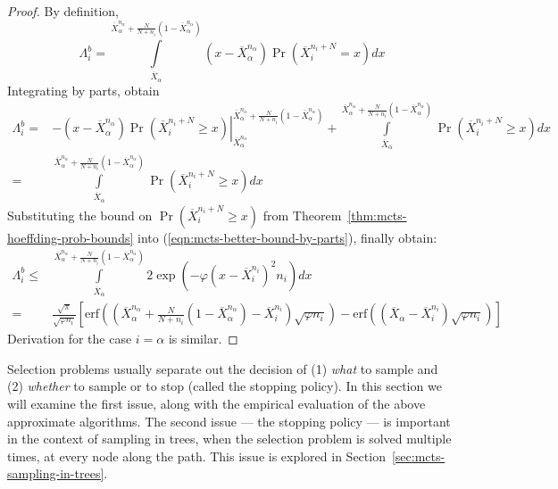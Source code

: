 \begin{proof}By definition,
\begin{equation}
\Lambda_i^b=\int\limits_{\overline X_\alpha}^{\overline X_\alpha^{n_\alpha}+\frac N {N+n_i}(1-\overline X_\alpha^{n_\alpha})}(x-\overline X_\alpha^{n_\alpha})\Pr\left(\overline X_i^{n_i+N}=x\right)dx
\label{eqn:mcts-lambda-blinkered-by-def}
\end{equation}
Integrating by parts, obtain
\begin{align}
\Lambda_i^b=&-\left.(x-\overline X_\alpha^{n_\alpha})\Pr\left(\overline X_i^{n_i+N}\ge x\right)\right|_{\overline X_\alpha^{n_\alpha}}^{\overline X_\alpha^{n_\alpha}+\frac N {N+n_i}(1-\overline X_\alpha^{n_\alpha})}+\int\limits_{\overline X_\alpha}^{\overline X_\alpha^{n_\alpha}+\frac N {N+n_i}(1-\overline X_\alpha^{n_\alpha})}\Pr\left(\overline X_i^{n_i+N}\ge x\right)dx\nonumber\\
=&\int\limits_{\overline X_\alpha}^{\overline X_\alpha^{n_\alpha}+\frac N {N+n_i}(1-\overline X_\alpha^{n_\alpha})}\Pr\left(\overline X_i^{n_i+N}\ge x\right)dx
\label{eqn:mcts-better-bound-by-parts}
\end{align}
Substituting the bound on $\Pr\left(\overline X_i^{n_i+N}\ge x\right)$ from Theorem~\ref{thm:mcts-hoeffding-prob-bounds} into (\ref{eqn:mcts-better-bound-by-parts}), finally obtain:
\begin{align}
\Lambda_i^b\le&\int\limits_{\overline X_\alpha}^{\overline X_\alpha^{n_\alpha}+\frac N {N+n_i}(1-\overline X_\alpha^{n_\alpha})}2\exp\left(-\varphi(x-\overline X_i^{n_i})^2n_i\right)dx\nonumber\\
 =&\frac {\sqrt \pi} {\sqrt {\varphi n_i}}
  \left[\mathrm{erf}\left(\left(\overline X_\alpha^{n_\alpha}+\frac N {N+n_i}(1-\overline X_\alpha^{n_\alpha})-\overline X_i^{n_i}\right)\sqrt {\varphi n_i}\right)-\mathrm{erf}\left((\overline X_\alpha - \overline X_i^{n_i})\sqrt{\varphi n_i}\right)\right]
\end{align}
Derivation for the case $i=\alpha$ is similar.
\end{proof}

Selection problems usually separate out the decision of (1) {\em what}
to sample and (2) {\em whether} to sample or to stop (called the stopping policy).
In this section we will examine the first issue, along with the empirical evaluation 
of the above approximate algorithms. The second issue --- the stopping
policy --- is important in the context of sampling in trees, when the
selection problem is solved multiple times, at every node along the
path. This issue is explored in Section~\ref{sec:mcts-sampling-in-trees}.

